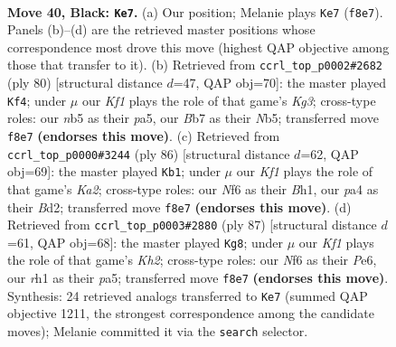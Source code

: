 \documentclass[11pt]{article}
\begin{document}
\clearpage

\begin{figure}[p]\centering
\begin{subfigure}{0.46\textwidth}\centering
\resizebox{\linewidth}{!}{%
\newchessgame
\chessboard[
  setfen={5k1Q/1b3p2/qp3n2/1N6/P2PpK2/6R1/8/7R b - - 0 40},
  showmover=false,
  pgfstyle=straightmove, color=movearrow, markmove={f8-e7}
]}
\caption{}
\end{subfigure}\hfill
\begin{subfigure}{0.46\textwidth}\centering
\resizebox{\linewidth}{!}{%
\newchessgame
\chessboard[
  setfen={5k2/5Ppp/1p2B3/pN3P2/8/2Q2PK1/7P/3r2q1 w - - 9 41},
  showmover=false,
  pgfstyle=straightmove, color=movearrow, markmove={g3-f4}
]}
\caption{}
\end{subfigure}
\\[4pt]
\begin{subfigure}{0.46\textwidth}\centering
\resizebox{\linewidth}{!}{%
\newchessgame
\chessboard[
  setfen={k7/1p6/p4QPp/1r6/q4P2/8/KP1B4/7B w - - 8 44},
  showmover=false,
  pgfstyle=straightmove, color=movearrow, markmove={a2-b1}
]}
\caption{}
\end{subfigure}\hfill
\begin{subfigure}{0.46\textwidth}\centering
\resizebox{\linewidth}{!}{%
\newchessgame
\chessboard[
  setfen={8/6pk/4p3/P4p1Q/2b5/2NpP1b1/3q4/2R2K2 b - - 1 44},
  showmover=false,
  pgfstyle=straightmove, color=movearrow, markmove={h7-g8}
]}
\caption{}
\end{subfigure}
\caption{\textbf{Move 40, Black: \texttt{Ke7}.} (a) Our position; Melanie plays \texttt{Ke7} (\texttt{f8e7}). Panels (b)--(d) are the retrieved master positions whose correspondence most drove this move (highest QAP objective among those that transfer to it). (b) Retrieved from \texttt{ccrl\_top\_p0002\#2682} (ply 80) [structural distance $d$=47, QAP obj=70]: the master played \texttt{Kf4}; under $\mu$ our \emph{Kf1} plays the role of that game's \emph{Kg3}; cross-type roles: our \emph{n}b5 as their \emph{p}a5, our \emph{B}b7 as their \emph{N}b5; transferred move \texttt{f8e7} \textbf{(endorses this move)}. (c) Retrieved from \texttt{ccrl\_top\_p0000\#3244} (ply 86) [structural distance $d$=62, QAP obj=69]: the master played \texttt{Kb1}; under $\mu$ our \emph{Kf1} plays the role of that game's \emph{Ka2}; cross-type roles: our \emph{N}f6 as their \emph{B}h1, our \emph{p}a4 as their \emph{B}d2; transferred move \texttt{f8e7} \textbf{(endorses this move)}. (d) Retrieved from \texttt{ccrl\_top\_p0003\#2880} (ply 87) [structural distance $d$=61, QAP obj=68]: the master played \texttt{Kg8}; under $\mu$ our \emph{Kf1} plays the role of that game's \emph{Kh2}; cross-type roles: our \emph{N}f6 as their \emph{P}e6, our \emph{r}h1 as their \emph{p}a5; transferred move \texttt{f8e7} \textbf{(endorses this move)}. Synthesis: 24 retrieved analogs transferred to \texttt{Ke7} (summed QAP objective 1211, the strongest correspondence among the candidate moves); Melanie committed it via the \texttt{search} selector.}
\label{fig:thought-m79}
\end{figure}
\end{document}
